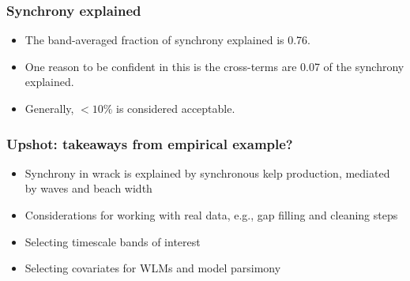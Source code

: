 \documentclass{beamer}
\begin{document}
\begin{frame}
\frametitle{Synchrony explained}
\begin{itemize}
\item The band-averaged fraction of synchrony explained is 0.76.
\item One reason to be confident in this is the cross-terms are 0.07 of the synchrony explained.
\item Generally, $<10\%$ is considered acceptable.
\end{itemize}
\end{frame}

{
\begin{frame}
\frametitle{Upshot: takeaways from empirical example?}
\begin{itemize}
\item Synchrony in wrack is explained by synchronous kelp production, mediated by waves and beach width
\item Considerations for working with real data, e.g., gap filling and cleaning steps
\item Selecting timescale bands of interest
\item Selecting covariates for WLMs and model parsimony
\end{itemize}
\end{frame}}
\end{document}
